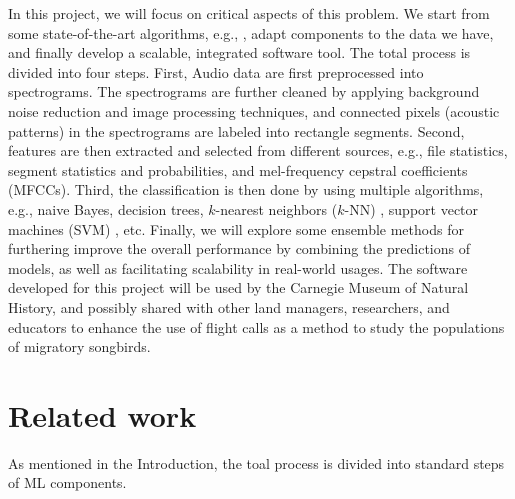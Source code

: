 \documentclass{article} %
\begin{document}
In this project, we will focus on critical aspects of this problem. We start from some state-of-the-art algorithms, e.g., \cite{mlsp2,chennovel13,briggs2013instance,Lasseck13,Massaron13,stattnersong13}, adapt components to the data we have, and finally develop a scalable, integrated software tool. The total process is divided into four steps. First, Audio data are first preprocessed into spectrograms. The spectrograms are further cleaned by applying background noise reduction and image processing techniques, and connected pixels (acoustic patterns) in the spectrograms are labeled into rectangle segments. Second, features are then extracted and selected from different sources, e.g., file statistics, segment statistics and probabilities, and mel-frequency cepstral coefficients (MFCCs). Third, the classification is then done by using multiple algorithms, e.g., naive Bayes, decision trees, $k$-nearest neighbors ($k$-NN) \cite{cover1967nearest}, support vector machines (SVM) \cite{cortes1995support}, etc. Finally, we will explore some ensemble methods \cite{breiman2001random,breiman1996bagging,freund1997decision,hoeting1999bayesian,read2011classifier} for furthering improve the overall performance by combining the predictions of models, as well as facilitating scalability in real-world usages. The software developed for this project will be used by the Carnegie Museum of Natural History, and possibly shared with other land managers, researchers, and educators to enhance the use of flight calls as a method to study the populations of migratory songbirds. 


\section{Related work}

As mentioned in the Introduction, the toal process is divided into standard steps of ML components.  
\end{document}
